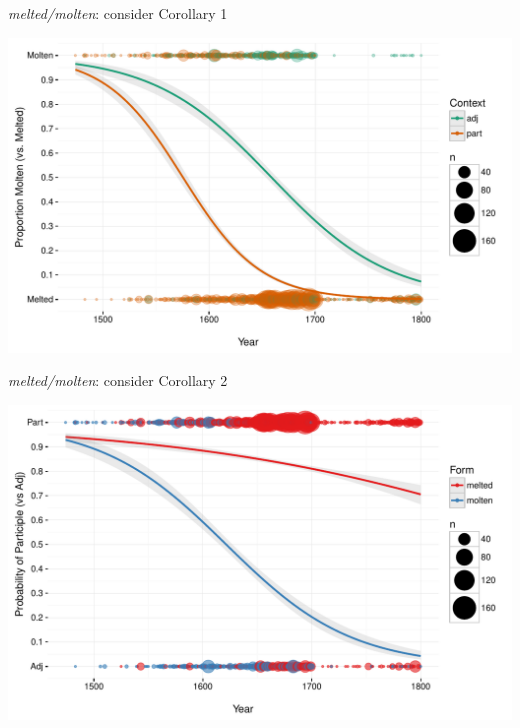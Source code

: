 \documentclass[hyperref={pdfpagelabels=false}]{beamer}
\begin{document}
\begin{frame}{\textsl{melted/molten}: consider Corollary 1}

\includegraphics[width=1.128\textwidth]{FormByDateUnbinnedWithDots2.pdf}
\end{frame}

\begin{frame}{\textsl{melted/molten}: consider Corollary 2}

\begin{center}
\includegraphics[width=1.128\textwidth]{ContextByDateUnbinnedWithDots2.pdf}
\end{center}
\end{frame}
\end{document}
